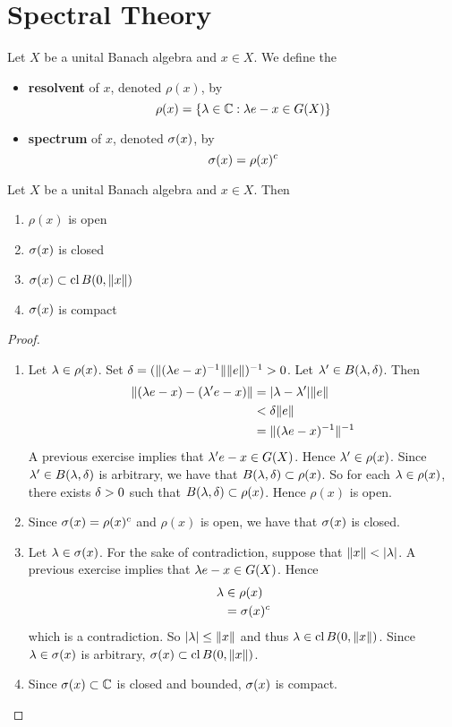\documentclass{book}
\begin{document}
\newpage
\section{Spectral Theory}

\begin{defn}
	Let $X$ be a unital Banach algebra and $x \in X$. We define the
	\begin{itemize}
		\item \textbf{resolvent} of $x$, denoted $\rho(x)$, by 
		$$\rho(x) = \{\lambda \in \mathbb{C}: \lambda e - x \in G(X)\}$$
		\item \textbf{spectrum} of $x$, denoted $\sigma(x)$, by 
		$$\sigma(x) = \rho(x)^c$$ 
	\end{itemize}
\end{defn}

\begin{ex}
	Let $X$ be a unital Banach algebra and $x \in X$. Then 
	\begin{enumerate}
		\item $\rho(x)$ is open
		\item $\sigma(x)$ is closed
		\item $\sigma(x) \subset \operatorname{cl} B(0, \|x\|)$
		\item  $\sigma(x)$ is compact
	\end{enumerate} 
\end{ex}

\begin{proof}\
	\begin{enumerate}
		\item Let $\lambda \in \rho(x)$. Set $\delta = (\|(\lambda e - x)^{-1}\| \|e\| )^{-1} > 0$. Let $\lambda' \in B(\lambda, \delta)$. Then 
		\begin{align*}
			\|(\lambda e - x) - (\lambda' e - x)\| 
			& = |\lambda - \lambda '|\|e\| \\
			& <  \delta \|e\| \\
			& = \|(\lambda e - x)^{-1}\|^{-1} \\
		\end{align*}
		A previous exercise implies that $\lambda' e - x \in G(X)$. Hence $\lambda' \in \rho(x)$. Since $\lambda' \in B(\lambda, \delta)$ is arbitrary, we have that $B(\lambda, \delta) \subset \rho(x)$. So for each $\lambda \in \rho(x)$, there exists $\delta >0$ such that $B(\lambda ,\delta) \subset \rho(x)$. Hence $\rho(x)$ is open.
		\item Since $\sigma(x) = \rho(x)^c$ and $\rho(x)$ is open, we have that $\sigma(x)$ is closed.
		\item Let $\lambda \in \sigma(x)$. For the sake of contradiction, suppose that $\|x\| < |\lambda|$. A previous exercise implies that $\lambda e - x \in G(X)$. Hence 
		\begin{align*}
			\lambda 
			& \in \rho(x) \\
			& = \sigma(x)^c
		\end{align*}
		which is a contradiction. So $|\lambda| \leq \|x\|$ and thus $\lambda \in \operatorname{cl} B(0, \|x\|)$. Since $\lambda \in \sigma(x)$ is arbitrary, $\sigma(x) \subset \operatorname{cl} B(0, \|x\|)$.
		\item Since $\sigma(x) \subset \mathbb{C}$ is closed and bounded, $\sigma(x)$ is compact.
	\end{enumerate} 
\end{proof}
\end{document}
